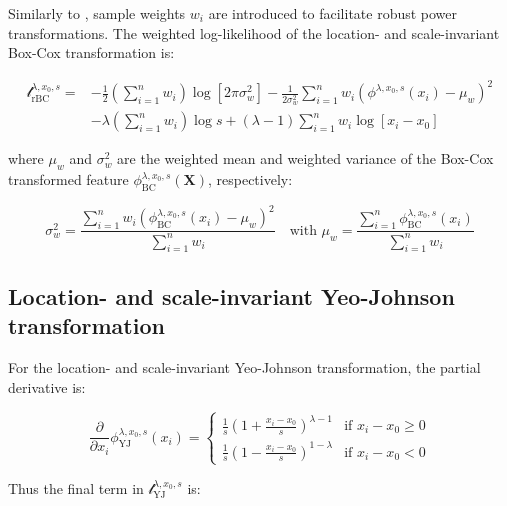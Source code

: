 \documentclass[preprint,12pt,authoryear]{elsarticle}
\begin{document}
Similarly to \citet{Raymaekers2024-zf}, sample weights \(w_i\) are
introduced to facilitate robust power transformations. The weighted
log-likelihood of the location- and scale-invariant Box-Cox
transformation is:

\begin{equation}
\begin{split}
\mathcal{l}_{\text{rBC}}^{\lambda, x_0, s} = & -\frac{1}{2} \left(\sum_{i=1}^n w_i \right) \log \left[ 2 \pi \sigma_w^2 \right] -\frac{1}{2 \sigma_w^2} \sum_{i=1}^n w_i \left( \phi^{\lambda, x_0, s}(x_i) - \mu_w \right)^2 \\
& - \lambda \left( \sum_{i=1}^n w_i \right) \log s + \left( \lambda - 1 \right) \sum_{i=1}^n w_i \log \left[ x_i - x_0 \right]
\end{split}
\end{equation}

where \(\mu_w\) and \(\sigma^2_w\) are the weighted mean and weighted
variance of the Box-Cox transformed feature
\(\phi_{\text{BC}}^{\lambda, x_0, s} (\mathbf{X})\), respectively:

\begin{equation}
\sigma_w^2 = \frac{\sum_{i=1}^n w_i \left(\phi_{\text{BC}}^{\lambda, x_0, s} (x_i) - \mu_w \right)^2}{\sum_{i=1}^n w_i} \quad \text{with } \mu_w = \frac{\sum_{i=1}^n \phi_{\text{BC}}^{\lambda, x_0, s} (x_i)} {\sum_{i=1}^n w_i}
\end{equation}

\subsection{Location- and scale-invariant Yeo-Johnson
transformation}\label{location--and-scale-invariant-yeo-johnson-transformation}

For the location- and scale-invariant Yeo-Johnson transformation, the
partial derivative is:

\begin{equation}
\frac{\partial}{\partial x_i} \phi_{\text{YJ}}^{\lambda, x_0, s}(x_i) =
\begin{cases}
\frac{1}{s} \left(1 + \frac{x_i - x_0}{s}\right)^{\lambda - 1} & \text{if } x_i - x_0 \geq 0\\
\frac{1}{s} \left(1 - \frac{x_i - x_0}{s}\right)^{1 - \lambda} & \text{if } x_i - x_0 < 0
\end{cases}
\end{equation}

Thus the final term in \(\mathcal{l}_{\text{YJ}}^{\lambda, x_0, s}\) is:
\end{document}
